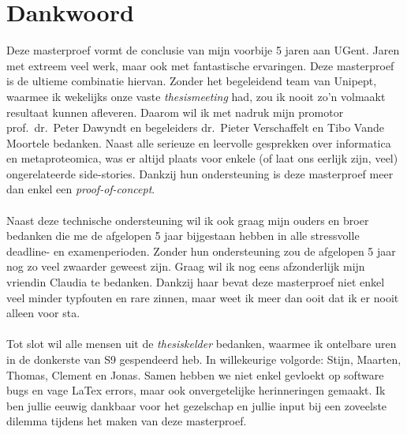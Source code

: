 \chapter{Dankwoord}\label{ch:dankwoord}
Deze masterproef vormt de conclusie van mijn voorbije 5 jaren aan UGent.
Jaren met extreem veel werk, maar ook met fantastische ervaringen.
Deze masterproef is de ultieme combinatie hiervan.
Zonder het begeleidend team van Unipept, waarmee ik wekelijks onze vaste \textit{thesismeeting} had, zou ik nooit zo'n volmaakt resultaat kunnen afleveren.
Daarom wil ik met nadruk mijn promotor prof.\ dr.\ Peter Dawyndt en begeleiders dr.\ Pieter Verschaffelt en Tibo Vande Moortele bedanken.
Naast alle serieuze en leervolle gesprekken over informatica en metaproteomica, was er altijd plaats voor enkele (of laat ons eerlijk zijn, veel) ongerelateerde side-stories.
Dankzij hun ondersteuning is deze masterproef meer dan enkel een \textit{proof-of-concept}.
\\ \\
Naast deze technische ondersteuning wil ik ook graag mijn ouders en broer bedanken die me de afgelopen 5 jaar bijgestaan hebben in alle stressvolle deadline- en examenperioden.
Zonder hun ondersteuning zou de afgelopen 5 jaar nog zo veel zwaarder geweest zijn.
Graag wil ik nog eens afzonderlijk mijn vriendin Claudia te bedanken.
Dankzij haar bevat deze masterproef niet enkel veel minder typfouten en rare zinnen, maar weet ik meer dan ooit dat ik er nooit alleen voor sta.
\\ \\
Tot slot wil alle mensen uit de \textit{thesiskelder} bedanken, waarmee ik ontelbare uren in de donkerste van S9 gespendeerd heb.
In willekeurige volgorde: Stijn, Maarten, Thomas, Clement en Jonas.
Samen hebben we niet enkel gevloekt op software bugs en vage LaTex errors, maar ook onvergetelijke herinneringen gemaakt.
Ik ben jullie eeuwig dankbaar voor het gezelschap en jullie input bij een zoveelste dilemma tijdens het maken van deze masterproef.
